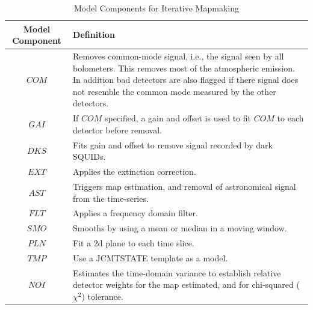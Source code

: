 \documentclass[twoside,11pt]{article}
\renewcommand{\_}{\texttt{\symbol{95}}}
\begin{document}
\begin{table}
\begin{tabular}{cp{10cm}}
 Model Component & Definition \\
\hline
$COM$ & Removes common-mode signal, i.e., the signal seen by all bolometers. This removes most of the atmospheric emission. In addition bad detectors are also flagged if there signal does not resemble the common mode measured by the other detectors. \\
$GAI$ & If $COM$ specified, a gain and offset is used to fit $COM$ to each detector before removal. \\
$DKS$ & Fits gain and offset to remove signal recorded by dark SQUIDs. \\
$EXT$ & Applies the extinction correction. \\
$AST$ & Triggers map estimation, and removal of astronomical signal from the time-series. \\
$FLT$ & Applies a frequency domain filter. \\
$SMO$ & Smooths by using a mean or median in a moving window. \\
$PLN$ & Fit a 2d plane to each time slice. \\
$TMP$ & Use a JCMTSTATE template as a model. \\
$NOI$ & Estimates the time-domain variance to establish relative detector weights for the map estimated, and for chi-squared ($\chi^2$) tolerance. \\
\hline
\end{tabular}
\caption{Model Components for Iterative Mapmaking}
\label{tab:dimm_components}
\end{table}
\end{document}
